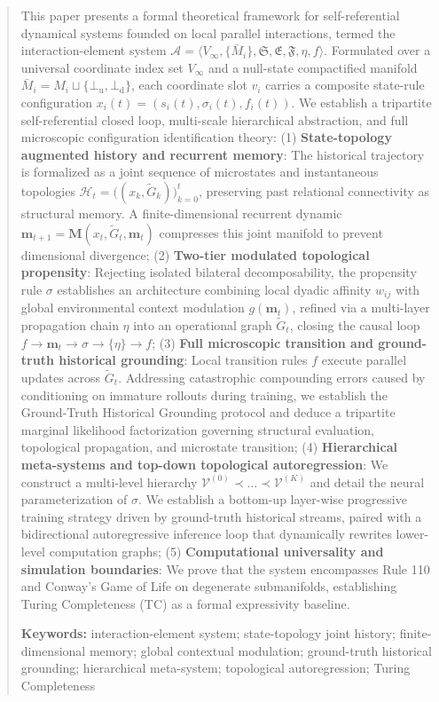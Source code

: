 \documentclass[11pt,a4paper]{article}
\numberwithin{equation}{section}
\theoremstyle{definition}
\theoremstyle{remark}
\begin{document}
	\vspace{1em}
	
	\renewcommand{\abstractname}{Abstract}
	\begin{abstract}
		This paper presents a formal theoretical framework for self-referential dynamical systems founded on local parallel interactions, termed the interaction-element system $\mathcal{A}=\langle V_\infty,\{\bar{M}_i\},\mathfrak{S},\mathfrak{E},\mathfrak{F},\eta,f\rangle$. Formulated over a universal coordinate index set $V_\infty$ and a null-state compactified manifold $\bar{M}_i = M_i \sqcup \{\bot_{\mathrm{u}}, \bot_{\mathrm{d}}\}$, each coordinate slot $v_i$ carries a composite state-rule configuration $x_i(t)=(s_i(t),\sigma_i(t),f_i(t))$.
		We establish a tripartite self-referential closed loop, multi-scale hierarchical abstraction, and full microscopic configuration identification theory:
		(1) \textbf{State-topology augmented history and recurrent memory}: The historical trajectory is formalized as a joint sequence of microstates and instantaneous topologies $\mathcal{H}_t = \big( (x_k, \widetilde{G}_k) \big)_{k=0}^t$, preserving past relational connectivity as structural memory. A finite-dimensional recurrent dynamic $\mathbf{m}_{t+1} = \mathbf{M}(x_t, \widetilde{G}_t, \mathbf{m}_t)$ compresses this joint manifold to prevent dimensional divergence;
		(2) \textbf{Two-tier modulated topological propensity}: Rejecting isolated bilateral decomposability, the propensity rule $\sigma$ establishes an architecture combining local dyadic affinity $w_{ij}$ with global environmental context modulation $g(\mathbf{m}_t)$, refined via a multi-layer propagation chain $\eta$ into an operational graph $\widetilde{G}_t$, closing the causal loop $f \to \mathbf{m}_t \to \sigma \to \{\eta\} \to f$;
		(3) \textbf{Full microscopic transition and ground-truth historical grounding}: Local transition rules $f$ execute parallel updates across $\widetilde{G}_t$. Addressing catastrophic compounding errors caused by conditioning on immature rollouts during training, we establish the Ground-Truth Historical Grounding protocol and deduce a tripartite marginal likelihood factorization governing structural evaluation, topological propagation, and microstate transition;
		(4) \textbf{Hierarchical meta-systems and top-down topological autoregression}: We construct a multi-level hierarchy $\mathcal{V}^{(0)} \prec \dots \prec \mathcal{V}^{(K)}$ and detail the neural parameterization of $\sigma$. We establish a bottom-up layer-wise progressive training strategy driven by ground-truth historical streams, paired with a bidirectional autoregressive inference loop that dynamically rewrites lower-level computation graphs;
		(5) \textbf{Computational universality and simulation boundaries}: We prove that the system encompasses Rule 110 and Conway's Game of Life on degenerate submanifolds, establishing Turing Completeness (TC) as a formal expressivity baseline.
		\par\medskip
		\noindent\textbf{Keywords:} interaction-element system; state-topology joint history; finite-dimensional memory; global contextual modulation; ground-truth historical grounding; hierarchical meta-system; topological autoregression; Turing Completeness
	\end{abstract}
	
\end{document}
